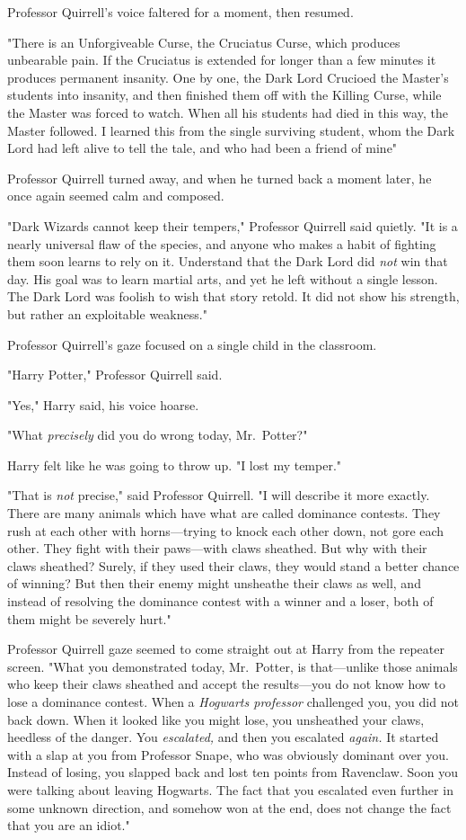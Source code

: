 Professor Quirrell's voice faltered for a moment, then resumed.

"There is an Unforgiveable Curse, the Cruciatus Curse, which produces
unbearable pain. If the Cruciatus is extended for longer than a few minutes it
produces permanent insanity. One by one, the Dark Lord Crucioed the Master's
students into insanity, and then finished them off with the Killing Curse,
while the Master was forced to watch. When all his students had died in this
way, the Master followed. I learned this from the single surviving student,
whom the Dark Lord had left alive to tell the tale, and who had been a friend
of mine{\el}"

Professor Quirrell turned away, and when he turned back a moment later, he once
again seemed calm and composed.

"Dark Wizards cannot keep their tempers," Professor Quirrell said quietly. "It
is a nearly universal flaw of the species, and anyone who makes a habit of
fighting them soon learns to rely on it. Understand that the Dark Lord did
\emph{not} win that day. His goal was to learn martial arts, and yet he left
without a single lesson. The Dark Lord was foolish to wish that story retold.
It did not show his strength, but rather an exploitable weakness."

Professor Quirrell's gaze focused on a single child in the classroom.

"Harry Potter," Professor Quirrell said.

"Yes," Harry said, his voice hoarse.

"What \emph{precisely} did you do wrong today, Mr.~Potter?"

Harry felt like he was going to throw up. "I lost my temper."

"That is \emph{not} precise," said Professor Quirrell. "I will describe it more
exactly. There are many animals which have what are called dominance contests.
They rush at each other with horns---trying to knock each other down, not gore
each other. They fight with their paws---with claws sheathed. But why with
their claws sheathed? Surely, if they used their claws, they would stand a
better chance of winning? But then their enemy might unsheathe their claws as
well, and instead of resolving the dominance contest with a winner and a loser,
both of them might be severely hurt."

Professor Quirrell gaze seemed to come straight out at Harry from the repeater
screen. "What you demonstrated today, Mr.~Potter, is that---unlike those
animals who keep their claws sheathed and accept the results---you do not know
how to lose a dominance contest. When a \emph{Hogwarts professor} challenged
you, you did not back down. When it looked like you might lose, you unsheathed
your claws, heedless of the danger. You \emph{escalated,} and then you
escalated \emph{again.} It started with a slap at you from Professor Snape, who
was obviously dominant over you. Instead of losing, you slapped back and lost
ten points from Ravenclaw. Soon you were talking about leaving Hogwarts. The
fact that you escalated even further in some unknown direction, and somehow won
at the end, does not change the fact that you are an idiot."

